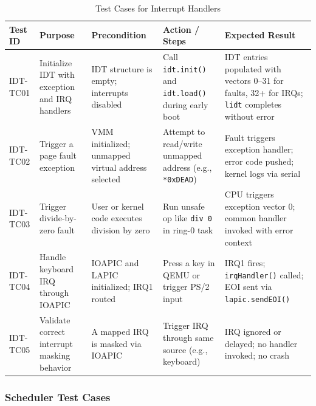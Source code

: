 \documentclass[12pt]{extarticle}
\begin{document}
\begin{table}[H]
\centering
\renewcommand{\arraystretch}{1.3}
\begin{tabular}{|p{1.4cm}|p{3.2cm}|p{3.0cm}|p{3.4cm}|p{3.4cm}|}
\hline
\textbf{Test ID} & \textbf{Purpose} & \textbf{Precondition} & \textbf{Action / Steps} & \textbf{Expected Result} \\
\hline

IDT-TC01 & Initialize IDT with exception and IRQ handlers & IDT structure is empty; interrupts disabled & Call \texttt{idt.init()} and \texttt{idt.load()} during early boot & IDT entries populated with vectors 0–31 for faults, 32+ for IRQs; \texttt{lidt} completes without error \\
\hline

IDT-TC02 & Trigger a page fault exception & VMM initialized; unmapped virtual address selected & Attempt to read/write unmapped address (e.g., \texttt{*0xDEAD}) & Fault triggers exception handler; error code pushed; kernel logs via serial \\
\hline

IDT-TC03 & Trigger divide-by-zero fault & User or kernel code executes division by zero & Run unsafe op like \texttt{div 0} in ring-0 task & CPU triggers exception vector 0; common handler invoked with error context \\
\hline

IDT-TC04 & Handle keyboard IRQ through IOAPIC & IOAPIC and LAPIC initialized; IRQ1 routed & Press a key in QEMU or trigger PS/2 input & IRQ1 fires; \texttt{irqHandler()} called; EOI sent via \texttt{lapic.sendEOI()} \\
\hline

IDT-TC05 & Validate correct interrupt masking behavior & A mapped IRQ is masked via IOAPIC & Trigger IRQ through same source (e.g., keyboard) & IRQ ignored or delayed; no handler invoked; no crash \\
\hline

\end{tabular}
\caption{Test Cases for Interrupt Handlers}
\label{table:idt-main-tests}
\end{table}

\subsubsection{Scheduler Test Cases}
\end{document}
